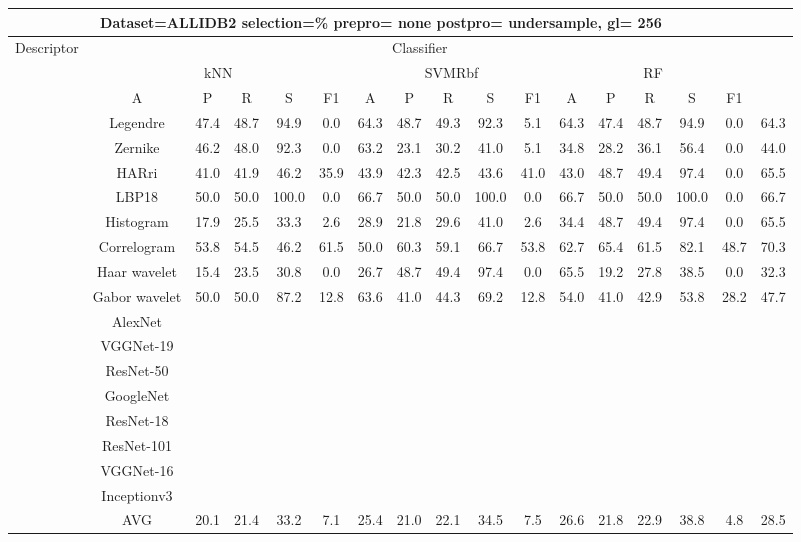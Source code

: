 \documentclass[12pt,italian]{article}
\begin{document}
\begin{tiny}
\begin{longtable}{lcccccccccccccccc}
\toprule
\multicolumn{16}{c}{Dataset=ALLIDB2 selection=\% prepro= none postpro= undersample, gl= 256} \\ 
\toprule
Descriptor & \multicolumn{15}{c}{Classifier} \\ 
& \multicolumn{5}{c}{kNN} & \multicolumn{5}{c}{SVMRbf} & \multicolumn{5}{c}{RF} \\ 
& A & P & R & S & F1 & A & P & R & S & F1 & A & P & R & S & F1 \\ 
\midrule
& Legendre & 47.4 & 48.7 & 94.9 &  0.0 & 64.3 & 48.7 & 49.3 & 92.3 &  5.1 & 64.3 & 47.4 & 48.7 & 94.9 &  0.0 & 64.3 \\ 
& Zernike & 46.2 & 48.0 & 92.3 &  0.0 & 63.2 & 23.1 & 30.2 & 41.0 &  5.1 & 34.8 & 28.2 & 36.1 & 56.4 &  0.0 & 44.0 \\ 
& HARri & 41.0 & 41.9 & 46.2 & 35.9 & 43.9 & 42.3 & 42.5 & 43.6 & 41.0 & 43.0 & 48.7 & 49.4 & 97.4 &  0.0 & 65.5 \\ 
& LBP18 & 50.0 & 50.0 & 100.0 &  0.0 & 66.7 & 50.0 & 50.0 & 100.0 &  0.0 & 66.7 & 50.0 & 50.0 & 100.0 &  0.0 & 66.7 \\ 
& Histogram & 17.9 & 25.5 & 33.3 &  2.6 & 28.9 & 21.8 & 29.6 & 41.0 &  2.6 & 34.4 & 48.7 & 49.4 & 97.4 &  0.0 & 65.5 \\ 
& Correlogram & 53.8 & 54.5 & 46.2 & 61.5 & 50.0 & 60.3 & 59.1 & 66.7 & 53.8 & 62.7 & 65.4 & 61.5 & 82.1 & 48.7 & 70.3 \\ 
& Haar wavelet & 15.4 & 23.5 & 30.8 &  0.0 & 26.7 & 48.7 & 49.4 & 97.4 &  0.0 & 65.5 & 19.2 & 27.8 & 38.5 &  0.0 & 32.3 \\ 
& Gabor wavelet & 50.0 & 50.0 & 87.2 & 12.8 & 63.6 & 41.0 & 44.3 & 69.2 & 12.8 & 54.0 & 41.0 & 42.9 & 53.8 & 28.2 & 47.7 \\ 
& AlexNet \\ 
& VGGNet-19 \\ 
& ResNet-50 \\ 
& GoogleNet \\ 
& ResNet-18 \\ 
& ResNet-101 \\ 
& VGGNet-16 \\ 
& Inceptionv3 \\ 
\hline
& AVG & 20.1 & 21.4 & 33.2 &  7.1 & 25.4 & 21.0 & 22.1 & 34.5 &  7.5 & 26.6 & 21.8 & 22.9 & 38.8 &  4.8 & 28.5 \\ 
\hline
\bottomrule
\end{longtable} 


\end{tiny}
\end{document}
